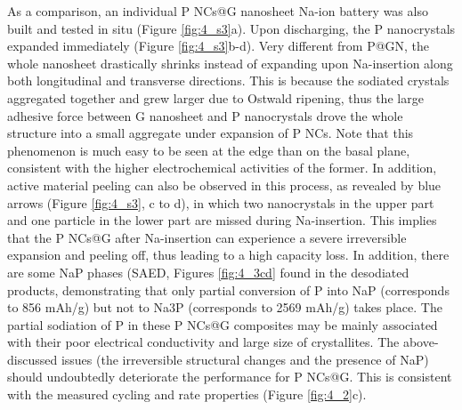 As a comparison, an individual P NCs@G nanosheet Na-ion battery was also built and tested in situ (Figure \ref{fig:4_s3}a). Upon discharging, the P nanocrystals expanded immediately (Figure \ref{fig:4_s3}b-d). Very different from P@GN, the whole nanosheet drastically shrinks instead of expanding upon Na-insertion along both longitudinal and transverse directions. This is because the sodiated crystals aggregated together and grew larger due to Ostwald ripening, thus the large adhesive force between G nanosheet and P nanocrystals drove the whole structure into a small aggregate under expansion of P NCs. Note that this phenomenon is much easy to be seen at the edge than on the basal plane, consistent with the higher electrochemical activities of the former. In addition, active material peeling can also be observed in this process, as revealed by blue arrows (Figure \ref{fig:4_s3}, c to d), in which two nanocrystals in the upper part and one particle in the lower part are missed during Na-insertion. This implies that the P NCs@G after Na-insertion can experience a severe irreversible expansion and peeling off, thus leading to a high capacity loss. In addition, there are some NaP phases (SAED, Figures \ref{fig:4_3cd} found in the desodiated products, demonstrating that only partial conversion of P into NaP (corresponds to 856 mAh/g) but not to Na3P (corresponds to 2569 mAh/g) takes place. The partial sodiation of P in these P NCs@G composites may be mainly associated with their poor electrical conductivity and large size of crystallites. The above-discussed issues (the irreversible structural changes and the presence of NaP) should undoubtedly deteriorate the performance for P NCs@G. This is consistent with the measured cycling and rate properties (Figure \ref{fig:4_2}c). \\

